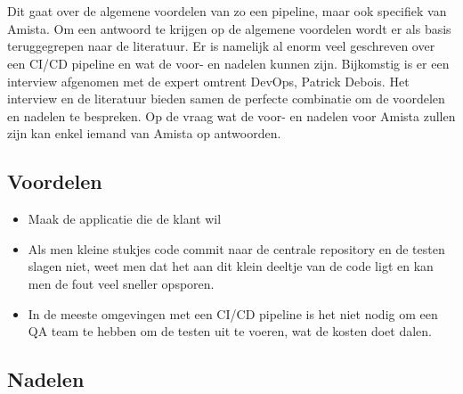 
\chapter{}
\label{ch:voor-en-nadelen-cicd}
Dit gaat over de algemene voordelen van zo een pipeline, maar ook specifiek van Amista. Om een antwoord te krijgen op de algemene voordelen wordt er als basis teruggegrepen naar de literatuur. Er is namelijk al enorm veel geschreven over een CI/CD pipeline en wat de voor- en nadelen kunnen zijn.
Bijkomstig is er een interview afgenomen met de expert omtrent DevOps, Patrick Debois.
Het interview en de literatuur bieden samen de perfecte combinatie om de voordelen en nadelen te bespreken.
Op de vraag wat de voor- en nadelen voor Amista zullen zijn kan enkel iemand van Amista op antwoorden.


\section{Voordelen}
\label{sec:voordelen}
\begin{itemize}
    \item Maak de applicatie die de klant wil %
    \item Als men kleine stukjes code commit naar de centrale repository en de testen slagen niet, weet men dat het aan dit klein deeltje van de code ligt en kan men de fout veel sneller opsporen. %
    \item In de meeste omgevingen met een CI/CD pipeline is het niet nodig om een QA team te hebben om de testen uit te voeren, wat de kosten doet dalen.
\end{itemize}

\section{Nadelen}
\label{sec:nadelen}
